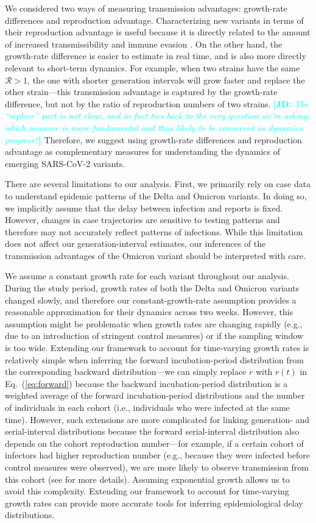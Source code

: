 \documentclass[12pt]{article}
\newcommand{\comment}{\showcomment}
\newcommand{\showcomment}[3]{\textcolor{#1}{\textbf{[#2: }\textsl{#3}\textbf{]}}}
\newcommand{\jd}[1]{\comment{cyan}{JD}{#1}}
\newcommand{\eref}[1]{Eq.~(\ref{eq:#1})}
\newcommand{\RR}{\ensuremath{{\mathcal R}}\xspace}
\begin{document}
We considered two ways of measuring transmission advantages: growth-rate differences and reproduction advantage.
Characterizing new variants in terms of their reproduction advantage is useful because it is directly related to the amount of increased transmissibility and immune evasion \citep{pearson2021bounding}.
On the other hand, the growth-rate difference is easier to estimate in real time, and is also more directly relevant to short-term dynamics. 
For example, when two strains have the same $\RR>1$, the one with shorter generation intervals will grow faster and replace the other strain---this transmission advantage is captured by the growth-rate difference, but not by the ratio of reproduction numbers of two strains.
\jd{The ``replace'' part is not clear, and in fact ties back to the very question we're asking; which measure is more fundamental and thus likely to be conserved as dynamics progress?}
Therefore, we suggest using growth-rate differences and reproduction advantage as complementary measures for understanding the dynamics of emerging SARS-CoV-2 variants.

There are several limitations to our analysis.
First, we primarily rely on case data to understand epidemic patterns of the Delta and Omicron variants.
In doing so, we implicitly assume that the delay between infection and reports is fixed.
However, changes in case trajectories are sensitive to testing patterns and therefore may not accurately reflect patterns of infections.
While this limitation does not affect our generation-interval estimates, our inferences of the transmission advantages of the Omicron variant should be interpreted with care.

We assume a constant growth rate for each variant throughout our analysis.
During the study period, growth rates of both the Delta and Omicron variants changed slowly, and therefore our constant-growth-rate assumption provides a reasonable approximation for their dynamics across two weeks.
However, this assumption might be problematic when growth rates are changing rapidly (e.g., due to an introduction of stringent control measures) or if the sampling window is too wide.
Extending our framework to account for time-varying growth rates is relatively simple when inferring the forward incubation-period distribution from the corresponding backward distribution---we can simply replace $r$ with $r(t)$ in \eref{forward} because the backward incubation-period distribution is a weighted average of the forward incubation-period distributions and the number of individuals in each cohort (i.e., individuals who were infected at the same time).
However, such extensions are more complicated for linking generation- and serial-interval distributions because the forward serial-interval distribution also depends on the cohort reproduction number---for example, if a certain cohort of infectors had higher reproduction number (e.g., because they were infected before control measures were observed), we are more likely to observe transmission from this cohort (see \citep{park2021forward} for more details).
Assuming exponential growth allows us to avoid this complexity.
Extending our framework to account for time-varying growth rates can provide more accurate tools for inferring epidemiological delay distributions.
\end{document}
